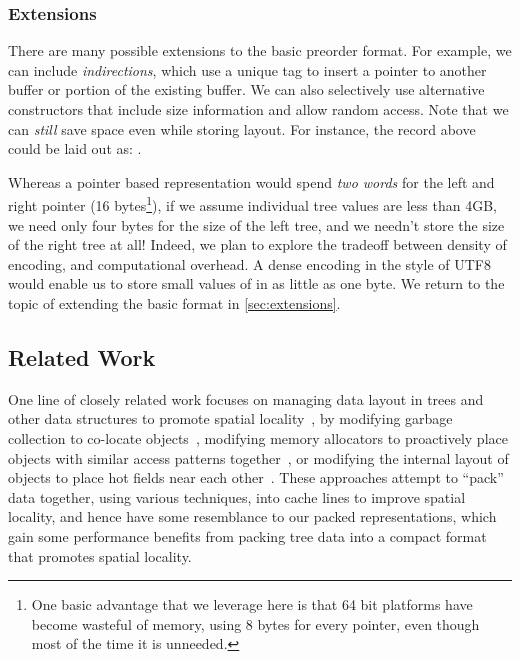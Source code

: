 \documentclass[a4paper,english]{lipics-v2016}
\begin{document}

\subsubsection{Extensions} \label{sec:extensions1}
There are many possible extensions to the basic preorder format. For example, we
can include {\em indirections}, which use a unique tag to insert a pointer to
another buffer or portion of the existing buffer. We can also selectively use alternative constructors that
include size information and allow random access.  Note that we can {\em still}
save space even while storing layout.  For instance, the  record above
could be laid out as: {}.

Whereas a pointer based representation would spend {\em two words} for the left
and right pointer (16 bytes\footnote{One basic advantage that we leverage here
  is that 64 bit platforms have become wasteful of memory, using 8 bytes for
  every pointer, even though most of the time it is unneeded.  }), if we assume
individual tree values are less than 4GB, we need only four bytes for the size
of the left tree, and we needn't store the size of the right tree at all!
Indeed, we plan to explore the tradeoff between density of encoding, and
computational overhead.  A dense encoding in the style of UTF8 would enable us
to store small values of  in as little as one byte.
%
We return to the topic of extending the basic format in \cref{sec:extensions}.


\subsection{Related Work}


One line of closely related work focuses on managing data layout in trees and
other data structures to promote spatial
locality~\cite{Chilimbi1999,Chilimbi1999b,Truong1998,Lattner2005,Chilimbi1999a},
by modifying garbage collection to co-locate objects~\cite{Chilimbi1999a},
modifying memory allocators to proactively place objects with similar access
patterns together~\cite{Lattner2005,Chilimbi1999}, or modifying the internal
layout of objects to place hot fields near each other~\cite{Chilimbi1999b}.
These approaches attempt to ``pack'' data together, using various techniques,
into cache lines to improve spatial locality, and hence have some resemblance
to our packed representations, which gain some performance benefits from
packing tree data into a compact format that promotes spatial locality.
\end{document}
